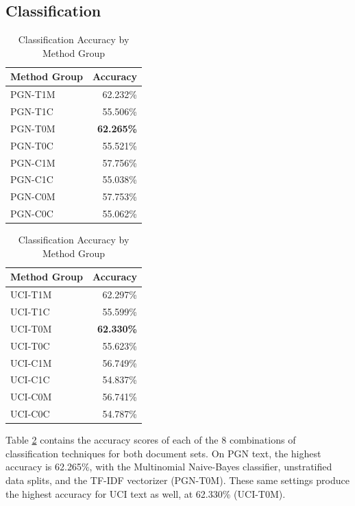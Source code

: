 \documentclass[conference]{IEEEtran}
\begin{document}
\subsection{Classification}
\begin{table}[htbp]
\caption{Classification Accuracy by Method Group}
\centering
\begin{tabular}{lr}
\hline\hline
Method Group & Accuracy \\ [0.5ex]
\hline
PGN-T1M & 62.232\% \\
PGN-T1C & 55.506\% \\
PGN-T0M & \textbf{62.265\%} \\
PGN-T0C & 55.521\% \\
PGN-C1M & 57.756\% \\
PGN-C1C & 55.038\% \\
PGN-C0M & 57.753\% \\
PGN-C0C & 55.062\% \\ [1ex]
\hline
\end{tabular}
\begin{tabular}{lr}
\hline\hline
Method Group & Accuracy \\ [0.5ex]
\hline
UCI-T1M & 62.297\% \\
UCI-T1C & 55.599\% \\
UCI-T0M & \textbf{62.330\%} \\
UCI-T0C & 55.623\% \\
UCI-C1M & 56.749\% \\
UCI-C1C & 54.837\% \\
UCI-C0M & 56.741\% \\
UCI-C0C & 54.787\% \\ [1ex]
\hline
\end{tabular}
\label{table:class-results}
\end{table}

Table \ref{table:class-results} contains the accuracy scores of each of the 8 combinations of classification techniques for both document sets. On PGN text, the highest accuracy is 62.265\%, with the Multinomial Naive-Bayes classifier, unstratified data splits, and the TF-IDF vectorizer (PGN-T0M). These same settings produce the highest accuracy for UCI text as well, at 62.330\% (UCI-T0M).
\end{document}
